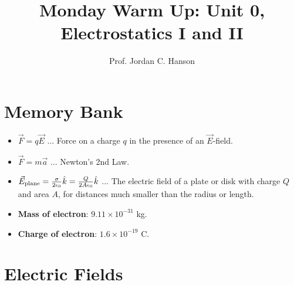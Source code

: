\documentclass{article}
\begin{document}
\twocolumn

\title{Monday Warm Up: Unit 0, Electrostatics I and II}
\author{Prof. Jordan C. Hanson}

\maketitle

\section{Memory Bank}

\begin{itemize}
\item $\vec{F} = q \vec{E}$ ... Force on a charge $q$ in the presence of an $\vec{E}$-field.
\item $\vec{F} = m\vec{a}$ ... Newton's 2nd Law.
\item $\vec{E}_{\rm plane} = \frac{\sigma}{2\epsilon_0}\hat{k} = \frac{Q}{2A\epsilon_0}\hat{k}$ ... The electric field of a plate or disk with charge $Q$ and area $A$, for distances much smaller than the radius or length.
\item \textbf{Mass of electron}: $9.11\times 10^{-31}$ kg.
\item \textbf{Charge of electron}: $1.6\times 10^{-19}$ C.
\end{itemize}

\section{Electric Fields}
\end{document}
